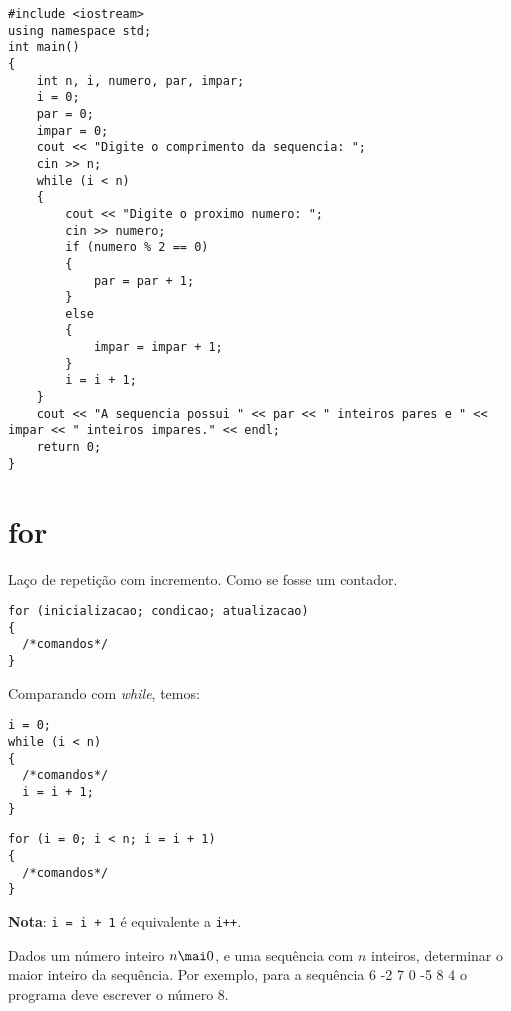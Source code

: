\documentclass[a4paper]{memoir}
\begin{document}
\begin{sol}
\begin{lstlisting}
#include <iostream>
using namespace std;
int main()
{
    int n, i, numero, par, impar;
    i = 0;
    par = 0;
    impar = 0;
    cout << "Digite o comprimento da sequencia: ";
    cin >> n;
    while (i < n)
    {
        cout << "Digite o proximo numero: ";
        cin >> numero;
        if (numero % 2 == 0)
        {
            par = par + 1;
        }
        else
        {
            impar = impar + 1;
        }
        i = i + 1;
    }
    cout << "A sequencia possui " << par << " inteiros pares e " << impar << " inteiros impares." << endl;
    return 0;
}
\end{lstlisting}
\end{sol}

\section{for}

Laço de repetição com incremento. Como se fosse um contador.

\begin{lstlisting}
for (inicializacao; condicao; atualizacao)
{
  /*comandos*/
}
\end{lstlisting}

Comparando com \emph{while}, temos:

\begin{minipage}[t]{.45\textwidth}
  \begin{lstlisting}
i = 0;
while (i < n)
{
  /*comandos*/
  i = i + 1;
}
  \end{lstlisting}
\end{minipage}
\begin{minipage}[t]{.45\textwidth}
  \begin{lstlisting}
for (i = 0; i < n; i = i + 1)
{
  /*comandos*/
}
  \end{lstlisting}
\end{minipage}

\textbf{Nota}: \verb|i = i + 1| é equivalente a \verb|i++|.

\begin{prob}\label{prob107.cpp}
Dados um número inteiro $n \mai 0$, e uma sequência com $n$ inteiros, determinar o maior inteiro da sequência. Por exemplo, para a sequência 6 -2 7 0 -5 8 4 o programa deve escrever o número 8.
\end{prob}
\end{document}
